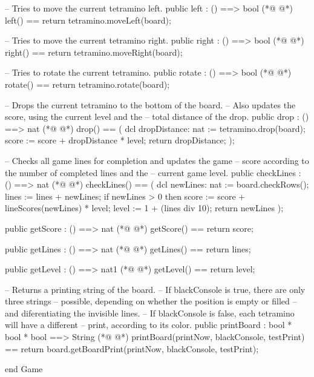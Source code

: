 \begin{vdmpp}[breaklines=true]
    -- Tries to move the current tetramino left.
  public left : () ==> bool
(*@
\label{left:78}
@*)
  left() ==
   return tetramino.moveLeft(board);

    -- Tries to move the current tetramino right.
  public right : () ==> bool
(*@
\label{right:83}
@*)
  right() ==
   return tetramino.moveRight(board);
   
    -- Tries to rotate the current tetramino.
  public rotate : () ==> bool
(*@
\label{rotate:88}
@*)
  rotate() ==
   return tetramino.rotate(board);

    -- Drops the current tetramino to the bottom of the board. 
    -- Also updates the score, using the current level and the
    -- total distance of the drop. 
  public drop : () ==> nat
(*@
\label{drop:95}
@*)
  drop() == (
   dcl dropDistance: nat := tetramino.drop(board);
   score := score + dropDistance * level;
   return dropDistance;
  );
  
  -- Checks all game lines for completion and updates the game
  -- score according to the number of completed lines and the
  -- current game level.
  public checkLines : () ==> nat
(*@
\label{checkLines:105}
@*)
  checkLines() == (
   dcl newLines: nat := board.checkRows();
   lines := lines + newLines;
   if newLines > 0 then score := score + lineScores(newLines) * level;
   level := 1 + (lines div 10);
   return newLines
  );

  public getScore : () ==> nat
(*@
\label{getScore:114}
@*)
  getScore() == return score;
   
  public getLines : () ==> nat
(*@
\label{getLines:117}
@*)
  getLines() == return lines;

  public getLevel : () ==> nat1
(*@
\label{getLevel:120}
@*)
  getLevel() == return level;
  
  -- Returns a printing string of the board.
  -- If blackConsole is true, there are only three strings
  -- possible, depending on whether the position is empty or filled
  -- and diferentiating the invisible lines.
  -- If blackConsole is false, each tetramino will have a different
  -- print, according to its color.
  public printBoard : bool * bool * bool ==> String
(*@
\label{printBoard:129}
@*)
  printBoard(printNow, blackConsole, testPrint) == 
   return board.getBoardPrint(printNow, blackConsole, testPrint);
   
end Game
\end{vdmpp}
